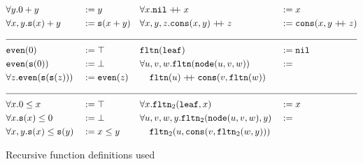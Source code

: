 
\begin{figure}
\footnotesize
$$\begin{aligned}&\forall y.0+y&&:=y&&\forall x.\nil\append x&&:=x\\
&\forall x,y.\suc(x)+y&&:=\suc(x+y)&&\forall x,y,z.\cons(x,y)\append z&&:=\cons(x,y\append z)\\
\cline{1-8}
&\even(0)&&:=\top&&\fltn(\bnil)&&:=\nil\\
&\even(\suc(0))&&:=\bot&&\forall u,v,w.\fltn(\bnode(u,v,w))&&:=\\
&\forall z.\even(\suc(\suc(z)))&&:=\even(z)&&\phantom{aa}\fltn(u)\append\cons(v,\fltn(w))\\
\cline{1-8}
&\forall x.0\leq x&&:=\top&&\forall x.\fltn_2(\bnil,x)&&:=x\\
&\forall x.\suc(x)\leq 0&&:=\bot&&\forall u,v,w,y.\fltn_2(\bnode(u,v,w),y)&&:=\\
&\forall x,y.\suc(x)\leq \suc(y)&&:=x\leq y&&\phantom{aa}\fltn_2(u,\cons(v,\fltn_2(w,y)))\\
\end{aligned}$$
\caption{Recursive function definitions used}
\label{fig:functions}
\end{figure}
